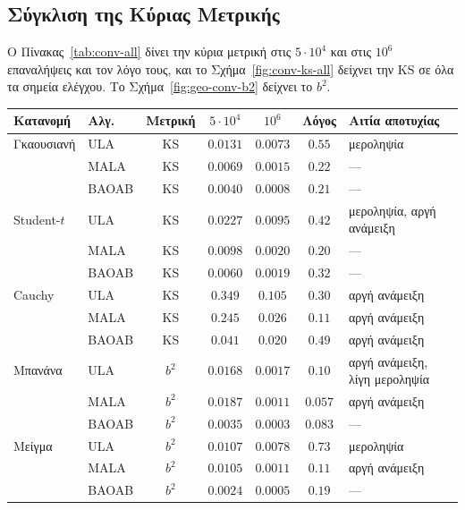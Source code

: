 \subsection{Σύγκλιση της Κύριας Μετρικής}
\label{sec:geo-convergence}

Ο Πίνακας~\ref{tab:conv-all} δίνει την κύρια μετρική στις $5 \cdot 10^4$ και στις
$10^6$ επαναλήψεις και τον λόγο τους, και το Σχήμα~\ref{fig:conv-ks-all} δείχνει την
KS σε όλα τα σημεία ελέγχου. Το Σχήμα~\ref{fig:geo-conv-b2} δείχνει το $b^2$.

\begin{table}[H]
\centering
\footnotesize
\begin{tabular}{llccccp{3.4cm}}
\toprule
Κατανομή & Αλγ. & Μετρική & $5 \cdot 10^4$ & $10^6$ & Λόγος & Αιτία αποτυχίας \\
\midrule
Γκαουσιανή   & ULA   & KS    & $0.0131$ & $0.0073$ & $0.55$ & μεροληψία \\
             & MALA  & KS    & $0.0069$ & $0.0015$ & $\mathbf{0.22}$ & --- \\
             & BAOAB & KS    & $0.0040$ & $0.0008$ & $\mathbf{0.21}$ & --- \\
\midrule
Student-$t$  & ULA   & KS    & $0.0227$ & $0.0095$ & $0.42$ & μεροληψία, αργή ανάμειξη \\
             & MALA  & KS    & $0.0098$ & $0.0020$ & $\mathbf{0.20}$ & --- \\
             & BAOAB & KS    & $0.0060$ & $0.0019$ & $0.32$ & --- \\
\midrule
Cauchy       & ULA   & KS    & $0.349$ & $0.105$ & $0.30$ & αργή ανάμειξη \\
             & MALA  & KS    & $0.245$ & $0.026$ & $0.11$ & αργή ανάμειξη \\
             & BAOAB & KS    & $0.041$ & $0.020$ & $0.49$ & αργή ανάμειξη \\
\midrule
Μπανάνα      & ULA   & $b^2$ & $0.0168$ & $0.0017$ & $0.10$ & αργή ανάμειξη, λίγη μεροληψία \\
             & MALA  & $b^2$ & $0.0187$ & $0.0011$ & $\mathbf{0.057}$ & αργή ανάμειξη \\
             & BAOAB & $b^2$ & $0.0035$ & $0.0003$ & $0.083$ & --- \\
\midrule
Μείγμα       & ULA   & $b^2$ & $0.0107$ & $0.0078$ & $0.73$ & μεροληψία \\
             & MALA  & $b^2$ & $0.0105$ & $0.0011$ & $0.11$ & αργή ανάμειξη \\
             & BAOAB & $b^2$ & $0.0024$ & $0.0005$ & $0.19$ & --- \\

\end{tabular}
\end{table}
